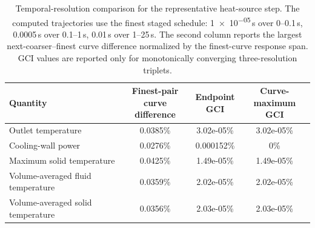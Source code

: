 \begin{table}[htbp]
\centering
\footnotesize
\setlength{\tabcolsep}{5pt}
\caption{Temporal-resolution comparison for the representative heat-source step. The computed trajectories use the finest staged schedule: \num{1e-05}\,s over \num{0}--\num{0.1}\,s, \num{0.0005}\,s over \num{0.1}--\num{1}\,s, \num{0.01}\,s over \num{1}--\num{25}\,s. The second column reports the largest next-coarser--finest curve difference normalized by the finest-curve response span. GCI values are reported only for monotonically converging three-resolution triplets.}
\label{tab:thermal_timestep}
\begin{tabular}{lccc}
\toprule
Quantity & \shortstack{Finest-pair curve\\difference} & \shortstack{Endpoint\\GCI} & \shortstack{Curve-maximum\\GCI} \\
\midrule
Outlet temperature & 0.0385\% & 3.02e-05\% & 3.02e-05\% \\
Cooling-wall power & 0.0276\% & 0.000152\% & 0\% \\
Maximum solid temperature & 0.0425\% & 1.49e-05\% & 1.49e-05\% \\
Volume-averaged fluid temperature & 0.0359\% & 2.02e-05\% & 2.02e-05\% \\
Volume-averaged solid temperature & 0.0356\% & 2.03e-05\% & 2.03e-05\% \\
\bottomrule
\end{tabular}
\end{table}
